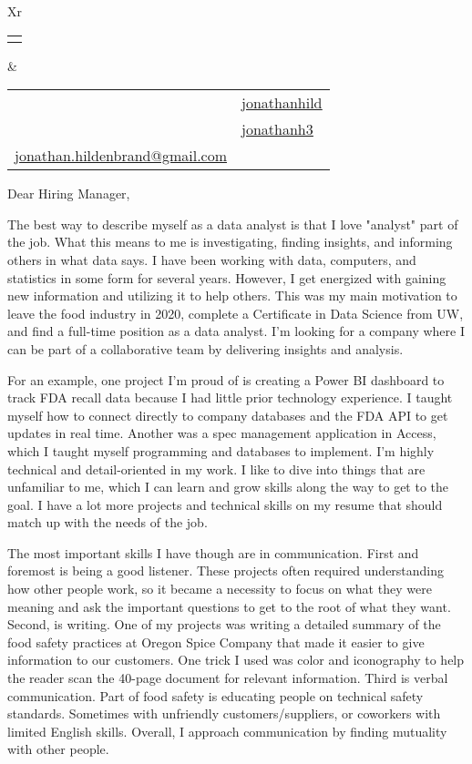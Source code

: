 \documentclass[letterpaper,12pt]{article}[leftmargin=*]
\makeatletter
\def\fullname{Jonathan Hildenbrand}
\def\githubicon{\faGithub}
\def\githublink{https://github.com/jonathanhild}
\def\githubtext{jonathanhild}
\def\linkedinicon{\faLinkedin}
\def\linkedinlink{https://linkedin.com/in/jonathanh3}
\def\linkedintext{jonathanh3}
\def\phoneicon{\faPhone}
\def\phonetext{+1-971-409-0695}
\def\emailicon{\faEnvelope}
\def\emaillink{mailto:jonathan.hildenbrand+resume@gmail.com}
\def\emailtext{jonathan.hildenbrand@gmail.com}
\def\locationicon{\faMapMarker}
\def\locationtext{Portland, Oregon}
\def\targeticon{\faBinoculars}
\def\targettext{Local \& Remote}
\def\headertype{\doublecol} %
\def\location{\hspace{3pt}\locationicon \hspace{5pt}{\color{links}\locationtext}}
\def\target{\targeticon\hspace{3pt}{\color{links}\targettext}}
\def\phone{\phoneicon\hspace{3pt}{\color{links}{\phonetext}}}
\def\linkedin{\linkedinicon\hspace{3pt}\href{\linkedinlink}{\underline{\linkedintext}}}
\def\email{\emailicon\hspace{3pt}\href{\emaillink}{\underline{\emailtext}}}
\def\github{\githubicon\hspace{3pt}\href{\githublink}{\underline{\githubtext}}}
\newcommand{\doublecol}[6]{
  \begin{tabularx}{\textwidth}{Xr}
    {
      \begin{tabular}[c]{l}
        \fontsize{24}{34}\selectfont{\color{primary}{{\textbf{\fullname}}}}
      \end{tabular}
    } & {
      \begin{tabular}[c]{l@{\hspace{1.5em}} l}
        {\small#4} & {\small#1} \\
        {\small#5} & {\small#2} \\
        {\small#6} & {\small#3}
      \end{tabular}
    }
  \end{tabularx}
}
\makeatother
\begin{document}
\headertype{\github}{\linkedin}{\phone}{\location}{\target}{\email} %

\vspace{48pt}

Dear Hiring Manager,

\vspace{24pt}

\hspace{24pt}The best way to describe myself as a data analyst is that I love "analyst" part of the job. What this means to me is investigating, finding insights, and informing others in what data says. I have been working with data, computers, and statistics in some form for several years. However, I get energized with gaining new information and utilizing it to help others. This was my main motivation to leave the food industry in 2020, complete a Certificate in Data Science from UW, and find a full-time position as a data analyst. I'm looking for a company where I can be part of a collaborative team by delivering insights and analysis.

\vspace{12pt}

\hspace{24pt}For an example, one project I'm proud of is creating a Power BI dashboard to track FDA recall data because I had little prior technology experience. I taught myself how to connect directly to company databases and the FDA API to get updates in real time. Another was a spec management application in Access, which I taught myself programming and databases to implement. I'm highly technical and detail-oriented in my work. I like to dive into things that are unfamiliar to me, which I can learn and grow skills along the way to get to the goal. I have a lot more projects and technical skills on my resume that should match up with the needs of the job.

\vspace{12pt}

\hspace{24pt}The most important skills I have though are in communication. First and foremost is being a good listener. These projects often required understanding how other people work, so it became a necessity to focus on what they were meaning and ask the important questions to get to the root of what they want. Second, is writing. One of my projects was writing a detailed summary of the food safety practices at Oregon Spice Company that made it easier to give information to our customers. One trick I used was color and iconography to help the reader scan the 40-page document for relevant information. Third is verbal communication. Part of food safety is educating people on technical safety standards. Sometimes with unfriendly customers/suppliers, or coworkers with limited English skills. Overall, I approach communication by finding mutuality with other people.
\end{document}
